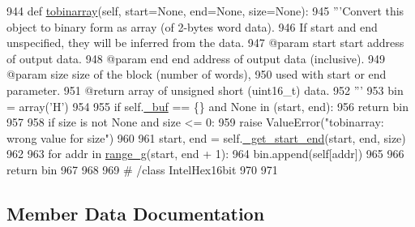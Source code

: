 \begin{DoxyCode}
944     \textcolor{keyword}{def }\hyperlink{classsoftware_1_1chipwhisperer_1_1capture_1_1utils_1_1IntelHex_1_1IntelHex16bit_aaeaa6a3ba064f3574d752309cefc1633}{tobinarray}(self, start=None, end=None, size=None):
945         \textcolor{stringliteral}{'''Convert this object to binary form as array (of 2-bytes word data).}
946 \textcolor{stringliteral}{        If start and end unspecified, they will be inferred from the data.}
947 \textcolor{stringliteral}{        @param  start   start address of output data.}
948 \textcolor{stringliteral}{        @param  end     end address of output data (inclusive).}
949 \textcolor{stringliteral}{        @param  size    size of the block (number of words),}
950 \textcolor{stringliteral}{                        used with start or end parameter.}
951 \textcolor{stringliteral}{        @return         array of unsigned short (uint16\_t) data.}
952 \textcolor{stringliteral}{        '''}
953         bin = array(\textcolor{stringliteral}{'H'})
954 
955         \textcolor{keywordflow}{if} self.\hyperlink{classsoftware_1_1chipwhisperer_1_1capture_1_1utils_1_1IntelHex_1_1IntelHex_a9acc18c6165db7a6540c07688a8e09ac}{\_buf} == \{\} \textcolor{keywordflow}{and} \textcolor{keywordtype}{None} \textcolor{keywordflow}{in} (start, end):
956             \textcolor{keywordflow}{return} bin
957 
958         \textcolor{keywordflow}{if} size \textcolor{keywordflow}{is} \textcolor{keywordflow}{not} \textcolor{keywordtype}{None} \textcolor{keywordflow}{and} size <= 0:
959             \textcolor{keywordflow}{raise} ValueError(\textcolor{stringliteral}{"tobinarray: wrong value for size"})
960 
961         start, end = self.\hyperlink{classsoftware_1_1chipwhisperer_1_1capture_1_1utils_1_1IntelHex_1_1IntelHex_aa25852bae4c5a890bbd9d0b40c01c1ac}{\_get\_start\_end}(start, end, size)
962 
963         \textcolor{keywordflow}{for} addr \textcolor{keywordflow}{in} \hyperlink{namespacesoftware_1_1chipwhisperer_1_1capture_1_1utils_1_1IntelHex_abac275d54b0c0dc47a6ef2f7c4f7bcdf}{range\_g}(start, end + 1):
964             bin.append(self[addr])
965 
966         \textcolor{keywordflow}{return} bin
967 
968 
969 \textcolor{comment}{# /class IntelHex16bit}
970 
971 
\end{DoxyCode}


\subsection{Member Data Documentation}
\hypertarget{classsoftware_1_1chipwhisperer_1_1capture_1_1utils_1_1IntelHex_1_1IntelHex16bit_a8c2c4cd2080774693d8fb6916e15c289}{}

